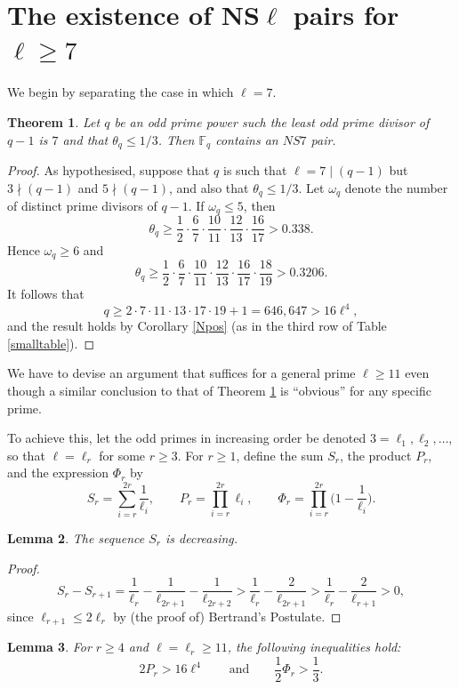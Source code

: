 \documentclass[12pt]{amsart}
\newtheorem{thm}{Theorem}[section]
\newtheorem{lemma}[thm]{Lemma}
\numberwithin{equation}{section}
\newcommand{\F}{\mathbb{F}_q}
\begin{document}
\section{The existence of NS$\ell$ pairs for $\ell \ge 7$}\label{bigL}

We begin by separating the case in which $\ell=7$.
\begin{thm}\label{l7}
Let $q$ be an odd prime power such the least odd prime divisor of $q-1$ is $7$ and that $\theta_q \le 1/3$. Then $\F$  contains an  $NS7$ pair.
\end{thm}

\begin{proof}
As hypothesised, suppose  that $q$ is such that $\ell=7 \mid (q-1)$ but $3 \nmid (q-1)$ and $5 \nmid (q-1)$, and also that $\theta_q \le 1/3$.   Let $\omega_q$ denote the number of distinct prime divisors of $q-1$.
If $\omega_q \le 5$, then
\[
\theta_q \ge \frac{1}{2} \cdot \frac{6}{7} \cdot \frac{10}{11} \cdot \frac{12}{13} \cdot \frac{16}{17} > 0.338.
\]
Hence $\omega_q \ge 6$ and
\[
\theta_q \ge \frac{1}{2} \cdot \frac{6}{7} \cdot \frac{10}{11} \cdot \frac{12}{13} \cdot \frac{16}{17} \cdot \frac{18}{19} > 0.3206.
\]
It follows that
\[
q \ge 2 \cdot 7 \cdot 11 \cdot 13 \cdot 17 \cdot 19 + 1 = 646,647> 16\ell^4,
\]
and the result holds by Corollary  \ref{Npos} (as in the third row of Table \ref{smalltable}).
\end{proof}

We have to devise an argument  that suffices for a general prime $\ell \geq 11$  even though a similar conclusion to that of Theorem \ref{l7} is ``obvious'' for any specific prime.

To achieve this, let the odd primes in increasing order be denoted $3=\ell_1, \ell_2, \dots$, so that $\ell = \ell_r$ for some $r \ge 3$. For $r \ge 1$, define the sum $S_r$, the product $P_r$, and the expression $\Phi_r$ by
\[
S_r = \sum_{i=r}^{2r} \frac{1}{\ell_i}, \qquad P_r = \prod_{i=r}^{2r} \ell_i, \qquad \Phi_r = \prod_{i=r}^{2r} \Big(1 - \frac{1}{\ell_i}\Big).
\]

\begin{lemma}\label{bertrand}
The sequence $S_r$ is decreasing.
\end{lemma}
\begin{proof}
\[
S_r -S_{r+1} =\frac{1}{\ell_r}-\frac{1}{\ell_{2r+1}}-\frac{1}{\ell_{2r+2}}>\frac{1}{\ell_r}-\frac{2}{\ell_{2r+1} }>\frac{1}{\ell_r}-\frac{2}{\ell_{r+1} }>0,
\]
since $\ell_{r+1} \le 2\ell_r$ by (the proof of) Bertrand's Postulate.
\end{proof}
\begin{lemma} \label{lbounds}
For $r \ge 4$ and $\ell = \ell_r \ge11 $, the following inequalities hold:
\[
2 P_r > 16 \ell^4 \qquad \text{and} \qquad \frac{1}{2} \Phi_r > \frac{1}{3}.
\]
\end{lemma}
\end{document}
